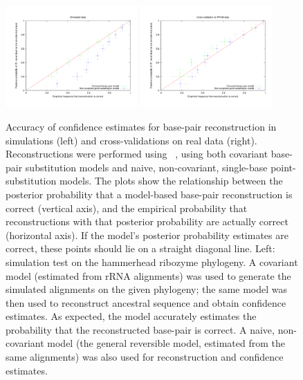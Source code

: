 \documentclass[10pt]{article}
\begin{document}
\begin{figure}[ht]
  \begin{center}
     \includegraphics [width=0.45\textwidth] {figs/hammer_paired.pdf}
     \hspace*{\fill}
     \includegraphics [width=0.45\textwidth] {figs/xval_paired.pdf}
  \end{center}
  \caption{
    Accuracy of confidence estimates for base-pair reconstruction in simulations (left) and cross-validations on real data (right).
    Reconstructions were performed using \xrate\ \cite{KlostermanEtAl2006},
    using both covariant base-pair substitution models
    and naive, non-covariant, single-base point-substitution models.
    The plots show the relationship between the posterior probability that a model-based base-pair reconstruction is correct (vertical axis),
    and the empirical probability that reconstructions with that posterior probability are actually correct (horizontal axis).
    If the model's posterior probability estimates are correct, these points should lie on a straight diagonal line.
    Left: simulation test on the hammerhead ribozyme phylogeny.
    A covariant model (estimated from rRNA alignments) was used to generate the simulated alignments on the given phylogeny; the same model was then used to reconstruct ancestral sequence and obtain confidence estimates.
    As expected, the model accurately estimates the probability that the reconstructed base-pair is correct.
    A naive, non-covariant model (the general reversible model, estimated from the same alignments) was also used for reconstruction and confidence estimates.
}
\end{figure}
\end{document}
